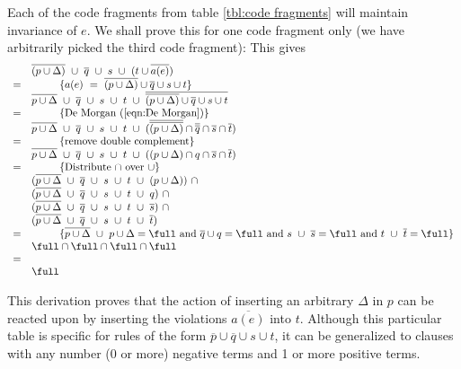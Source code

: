 \documentclass[11pt,a4paper,fleqn,oneside]{article}
\newcommand{\cmpl}[1]{\overline{#1}}
\begin{document}
	Each of the code fragments from table \ref{tbl:code fragments} will maintain invariance of $e$.
	We shall prove this for one code fragment only (we have arbitrarily picked the third code fragment):
	This gives
\[\begin{array}{rl}
&\cmpl{(p\cup\Delta)}\ \cup\ \cmpl{q}\ \cup\ s\ \cup\ (t\cup\cmpl{a(e)})\\
=&~~~~~~~~\{a(e)\ =\ \cmpl{(p\cup\Delta)}\cup\cmpl{q}\cup s\cup t\}\\
&\cmpl{p\cup\Delta}\ \cup\ \cmpl{q}\ \cup\ s\ \cup\ t\ \cup\ \cmpl{\cmpl{(p\cup\Delta)}\cup\cmpl{q}\cup s\cup t}\\
=&~~~~~~~~\{\text{De Morgan (\ref{eqn:De Morgan})}\}\\
&\cmpl{p\cup\Delta}\ \cup\ \cmpl{q}\ \cup\ s\ \cup\ t\ \cup\ (\cmpl{\cmpl{(p\cup\Delta)}}\cap\cmpl{\cmpl{q}}\cap\cmpl{s}\cap\cmpl{t})\\
=&~~~~~~~~\{\text{remove double complement}\}\\
&\cmpl{p\cup\Delta}\ \cup\ \cmpl{q}\ \cup\ s\ \cup\ t\ \cup\ ((p\cup\Delta)\cap q\cap\cmpl{s}\cap\cmpl{t})\\
=&~~~~~~~~\{\text{Distribute $\cap$ over $\cup$}\}\\
&(\cmpl{p\cup\Delta}\ \cup\ \cmpl{q}\ \cup\ s\ \cup\ t\ \cup\ (p\cup\Delta))\ \cap\\
&(\cmpl{p\cup\Delta}\ \cup\ \cmpl{q}\ \cup\ s\ \cup\ t\ \cup\ q)\ \cap\\
&(\cmpl{p\cup\Delta}\ \cup\ \cmpl{q}\ \cup\ s\ \cup\ t\ \cup\ \cmpl{s})\ \cap\\
&(\cmpl{p\cup\Delta}\ \cup\ \cmpl{q}\ \cup\ s\ \cup\ t\ \cup\ \cmpl{t})\\
=&~~~~~~~~\{\cmpl{p\cup\Delta}\ \cup\ p\cup\Delta=\full\text{~and~}\cmpl{q}\cup q=\full\text{~and~}s\ \cup\ \cmpl{s}=\full\text{~and~}t\ \cup\ \cmpl{t}=\full\}\\
&\full\cap \full\cap \full\cap \full\\
=\\
&\full\\
\end{array}\]


	This derivation proves that the action of inserting an arbitrary $\Delta$ in $p$ can be reacted upon by
	inserting the violations $\cmpl{a(e)}$ into $t$.
	Although this particular table is specific for rules of the form $\cmpl{p}\cup\cmpl{q}\cup s\cup t$,
	it can be generalized to clauses with any number (0 or more) negative terms
	and 1 or more positive terms.
	
\end{document}
